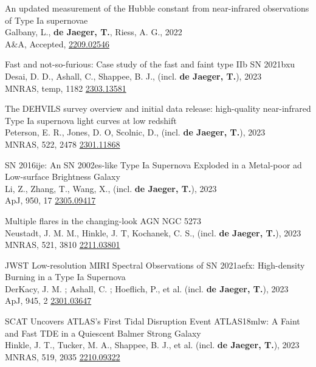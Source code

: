 \documentclass[12pt]{article}
\begin{document}
\vspace{0.2cm}
\begin{bibenum}

    \item 
An updated measurement of the Hubble constant from near-infrared observations of Type Ia supernovae\\
Galbany, L., \textbf{de Jaeger, T.}, Riess, A. G., 2022\\
A\&A, Accepted, \href{https://arxiv.org/abs/2209.02546}{2209.02546} 

    \item 
 Fast and not-so-furious: Case study of the fast and faint type IIb SN 2021bxu   \\
Desai, D. D., Ashall, C., Shappee, B. J., (incl. \textbf{de Jaeger, T.}), 2023 \\
MNRAS, temp, 1182 \href{https://arxiv.org/abs/2303.13581}{2303.13581}

    \item 
 The DEHVILS survey overview and initial data release: high-quality near-infrared Type Ia supernova light curves at low redshift \\
Peterson, E. R., Jones, D. O, Scolnic, D., (incl. \textbf{de Jaeger, T.}), 2023 \\
MNRAS, 522, 2478 \href{https://arxiv.org/abs/2301.11868}{2301.11868}
    \item 
SN 2016ije: An SN 2002es-like Type Ia Supernova Exploded in a Metal-poor ad Low-surface Brightness Galaxy  \\
Li, Z., Zhang, T., Wang, X., (incl. \textbf{de Jaeger, T.}), 2023 \\
ApJ, 950, 17 \href{https://arxiv.org/abs/2305.09417}{2305.09417}
    \item 
 Multiple flares in the changing-look AGN NGC 5273   \\
Neustadt, J. M. M., Hinkle, J. T, Kochanek, C. S., (incl. \textbf{de Jaeger, T.}), 2023 \\
MNRAS, 521, 3810 \href{https://arxiv.org/abs/2211.03801}{2211.03801}
    \item
  JWST Low-resolution MIRI Spectral Observations of SN 2021aefx: High-density Burning in a Type Ia Supernova  \\
DerKacy, J. M. ; Ashall, C. ; Hoeflich, P., et al. (incl. \textbf{de Jaeger, T.}), 2023\\
ApJ, 945, 2 \href{https://arxiv.org/abs/2301.03647}{2301.03647}  
    \item 
 SCAT Uncovers ATLAS's First Tidal Disruption Event ATLAS18mlw: A Faint and Fast TDE in a Quiescent Balmer Strong Galaxy\\ 
Hinkle, J. T., Tucker, M. A., Shappee, B. J., et al. (incl. \textbf{de Jaeger, T.}), 2023\\
MNRAS, 519, 2035 \href{https://arxiv.org/abs/2210.09322}{2210.09322} 


\end{bibenum}
\end{document}

